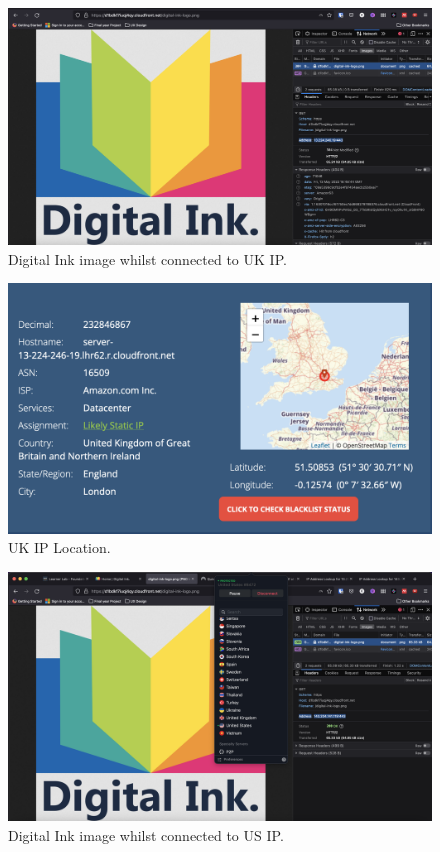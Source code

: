 \begin{figure}[!htbp]
    \centering
    \includegraphics[width=\textwidth]{resources/cloudfront/cloudfront-test-uk}
    \caption{Digital Ink image whilst connected to UK IP.}
    \label{fig:cloudfront-test--uk}
\end{figure}

\begin{figure}[!htbp]
    \centering
    \includegraphics[width=\textwidth]{resources/cloudfront/cloudfront-test-uk-ip}
    \caption{UK IP Location.}
    \label{fig:cloudfront-test-uk-ip}
\end{figure}

\begin{figure}[!htbp]
    \centering
    \includegraphics[width=\textwidth]{resources/cloudfront/cloudfront-test-us}
    \caption{Digital Ink image whilst connected to US IP.}
    \label{fig:cloudfront-test-us}
\end{figure}

